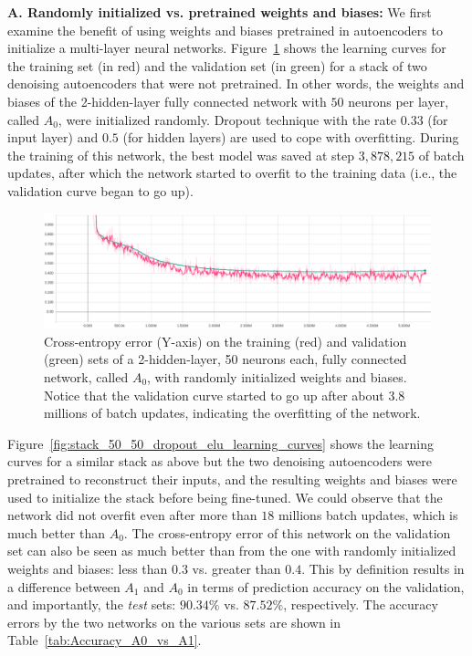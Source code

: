 \documentclass[12pt]{article}
\begin{document}
\vspace{5mm}
\noindent
\textbf{A. Randomly initialized vs. pretrained weights and biases:} We first examine the benefit of using weights and biases pretrained in autoencoders to initialize a multi-layer neural networks. Figure~\ref{fig:nopretrained_50_50} shows the learning curves for the training set (in red) and the validation set (in green) for a stack of two denoising autoencoders that were not pretrained. In other words, the weights and biases of the 2-hidden-layer fully connected network with $50$ neurons per layer, called $A_0$, were initialized randomly. Dropout technique with the rate $0.33$ (for input layer) and $0.5$ (for hidden layers) are used to cope with overfitting. During the training of this network, the best model was saved at step $3,878,215$ of batch updates, after which the network started to overfit to the training data (i.e., the validation curve began to go up). 

\begin{figure}
  \includegraphics[width=\linewidth]{figures/nopretrained_50_50.eps}
  \caption{Cross-entropy error (Y-axis) on the training (red) and validation (green) sets of a 2-hidden-layer, 50 neurons each, fully connected network, called $A_0$, with randomly initialized weights and biases. Notice that the validation curve started to go up after about $3.8$ millions of batch updates, indicating the overfitting of the network.}
  \label{fig:nopretrained_50_50}
\end{figure}

Figure~\ref{fig:stack_50_50_dropout_elu_learning_curves} shows the learning curves for a similar stack as above but the two denoising autoencoders were pretrained to reconstruct their inputs, and the resulting weights and biases were used to initialize the stack before being fine-tuned. We could observe that the network did not overfit even after more than $18$ millions batch updates, which is much better than $A_0$. The cross-entropy error of this network on the validation set can also be seen as much better than from the one with randomly initialized weights and biases: less than $0.3$ vs. greater than $0.4$. This by definition results in a difference between $A_1$ and $A_0$ in terms of prediction accuracy on the validation, and importantly, the \emph{test} sets: $90.34\%$ vs. $87.52\%$, respectively. The accuracy errors by the two networks on the various sets are shown in Table~\ref{tab:Accuracy_A0_vs_A1}.
\end{document}
